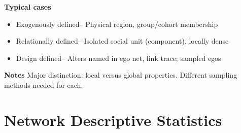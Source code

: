 \documentclass[]{book}
\theoremstyle{definition}
\theoremstyle{definition}
\theoremstyle{definition}
\theoremstyle{remark}
\begin{document}
\textbf{Typical cases}

\begin{itemize} 
\item Exogenously defined-- Physical region, group/cohort membership 
 \item Relationally defined-- Isolated social unit (component), locally dense 
 \item Design defined-- Alters named in ego net, link trace; sampled egos 
\end{itemize}

\noindent
 \textbf{Notes} Major distinction: local versus global properties.
Different sampling methods needed for each.

\chapter{Network Descriptive
Statistics}\label{network-descriptive-statistics}


\end{document}
